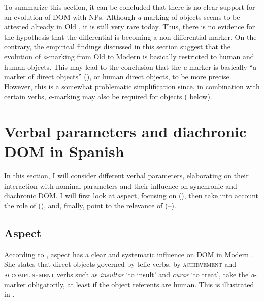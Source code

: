 \documentclass[output=paper]{LSP/langsci}
\begin{document}
To summarize this section, it can be concluded that there is no clear support for an evolution of DOM with  NPs. Although \textit{a}-marking of  objects seems to be attested already in Old , it is still very rare today. Thus, there is no evidence for the hypothesis that the differential  is becoming a non-differential  marker. On the contrary, the empirical findings discussed in this section suggest that the evolution of \textit{a}-marking from Old to Modern  is basically restricted to human  and human  objects. This may lead to the conclusion that the \textit{a}-marker is basically “a marker of  direct objects” (\citealt[132]{deSwart2007Cross-linguistic}), or human direct objects, to be more precise. However, this is a somewhat problematic simplification since, in combination with certain verbs, \textit{a}-marking may also be required for  objects (\cf {} below).

\section{Verbal parameters and diachronic DOM in Spanish}\label{08-ga-sec:4}

In this section, I will consider different verbal parameters, elaborating on their interaction with nominal parameters and their influence on synchronic and diachronic DOM. I will first look at aspect, focusing on  (), then take into account the role of  (), and, finally, point to the relevance of  (--).

\subsection{Aspect}\label{08-ga-sec:4.1}

According to \citet[1787--1790]{Torrego1999Gramatica}, aspect has a clear and systematic influence on DOM in Modern . She states that direct objects governed by telic verbs, \ie by \citet{Vendler1957Verbs} \textsc{achievement} and \textsc{accomplishment} verbs such as \textit{insultar} ‘to insult’ and \textit{curar} ‘to treat’, take the \textit{a}-marker obligatorily, at least if the object referents are human. This is illustrated in .
\end{document}
